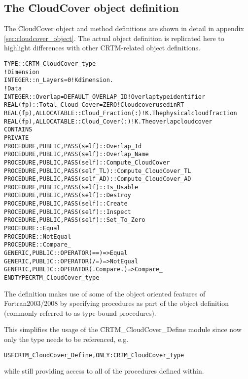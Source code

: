 \subsection{The \f{CloudCover} object definition}

The \f{CloudCover} object and method definitions are shown in detail in appendix \ref{sec:cloudcover_object}. The actual object definition is replicated here to highlight differences with other CRTM-related object definitions.

\begin{alltt}
  TYPE :: CRTM_CloudCover_type
    ! Dimension
    INTEGER :: n_Layers = 0                             ! K dimension.
    ! Data
    INTEGER  :: Overlap           = DEFAULT_OVERLAP_ID  ! Overlap type identifier
    REAL(fp) :: Total_Cloud_Cover = ZERO                ! Cloud cover used in RT
    REAL(fp), ALLOCATABLE :: Cloud_Fraction(:)          ! K. The physical cloud fraction
    REAL(fp), ALLOCATABLE :: Cloud_Cover(:)             ! K. The overlap cloud cover
  CONTAINS
    PRIVATE
    PROCEDURE, PUBLIC, PASS(self)    :: Overlap_Id
    PROCEDURE, PUBLIC, PASS(self)    :: Overlap_Name
    PROCEDURE, PUBLIC, PASS(self)    :: Compute_CloudCover
    PROCEDURE, PUBLIC, PASS(self_TL) :: Compute_CloudCover_TL
    PROCEDURE, PUBLIC, PASS(self_AD) :: Compute_CloudCover_AD
    PROCEDURE, PUBLIC, PASS(self)    :: Is_Usable
    PROCEDURE, PUBLIC, PASS(self)    :: Destroy
    PROCEDURE, PUBLIC, PASS(self)    :: Create
    PROCEDURE, PUBLIC, PASS(self)    :: Inspect
    PROCEDURE, PUBLIC, PASS(self)    :: Set_To_Zero
    PROCEDURE :: Equal
    PROCEDURE :: NotEqual
    PROCEDURE :: Compare_
    GENERIC, PUBLIC :: OPERATOR(==) => Equal
    GENERIC, PUBLIC :: OPERATOR(/=) => NotEqual
    GENERIC, PUBLIC :: OPERATOR(.Compare.) => Compare_
  END TYPE CRTM_CloudCover_type\end{alltt}

The definition makes use of some of the object oriented features of Fortran2003/2008 by specifying procedures as part of the object definition (commonly referred to as type-bound procedures).

This simplifies the usage of the \f{CRTM\_CloudCover\_Define} module since now only the type needs to be referenced, e.g.

\begin{alltt}
  USE CRTM_CloudCover_Define, ONLY: CRTM_CloudCover_type\end{alltt}

while still providing access to all of the procedures defined within.

